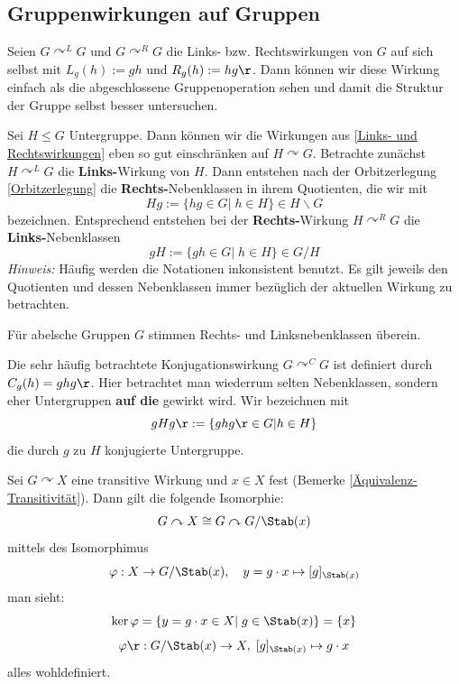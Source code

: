 \documentclass[11pt, a4paper]{article}
\begin{document}
\subsection{Gruppenwirkungen auf Gruppen}
\begin{definition} \label{Links- und Rechtswirkungen}
    Seien $G\curvearrowright^L G$ und $G\curvearrowright^R G$ die Links- bzw. Rechtswirkungen von $G$ auf sich selbst mit $L_g(h):=gh$ und $R_g(h):= hg\r$. Dann können wir diese Wirkung einfach als die abgeschlossene Gruppenoperation sehen und damit die Struktur der Gruppe selbst besser untersuchen.
\end{definition}
\begin{definition}[Nebenklassen]
Sei $H\leqslant G$ Untergruppe. Dann können wir die Wirkungen aus \ref{Links- und Rechtswirkungen} eben so gut einschränken auf $H \curvearrowright G$. Betrachte zunächst $H \curvearrowright^L G$ die \textbf{Links-}Wirkung von $H$. Dann entstehen nach der Orbitzerlegung \ref{Orbitzerlegung} die \textbf{Rechts-}Nebenklassen in ihrem Quotienten, die wir mit
$$Hg := \{hg \in G | \;  h \in H\}\in H\backslash G$$
bezeichnen. Entsprechend entstehen bei der \textbf{Rechts-}Wirkung $H \curvearrowright^R G$ die \textbf{Links-}Nebenklassen
$$gH:= \{gh \in G| \; h\in H\}\in G/H$$
\emph{Hinweis:} Häufig werden die Notationen inkonsistent benutzt. Es gilt jeweils den Quotienten und dessen Nebenklassen immer bezüglich der aktuellen Wirkung zu betrachten.
\end{definition}

\begin{note}
    Für abelsche Gruppen $G$ stimmen Rechts- und Linksnebenklassen überein.
\end{note}


\begin{definition}[Konjugationswirkung]
Die sehr häufig betrachtete Konjugationswirkung $G\curvearrowright^C G$ ist definiert durch $C_g(h)= ghg\r$. Hier betrachtet man wiederrum selten Nebenklassen, sondern eher Untergruppen \textbf{auf die} gewirkt wird. Wir bezeichnen mit
$$gHg\r := \{ghg\r \in G | h\in H\}$$
die durch $g$ zu $H$ konjugierte Untergruppe.
    
\end{definition}

\begin{theorem} \label{Klassifikation von transitiven Wirkungen}
Sei $G\curvearrowright X$ eine transitive Wirkung und $x\in X$ fest (Bemerke \ref{Äquivalenz-Transitivität}). Dann gilt die folgende Isomorphie:
$$G\curvearrowright X \cong G\curvearrowright G/\Stab(x)$$ mittels des Isomorphimus 
$$\varphi: X\to G/\Stab(x), \quad y = g\cdot x \mapsto [g]_{\Stab(x)}$$
man sieht:
$$\ker \varphi = \{y= g\cdot x\in X | \; g\in \Stab(x) \} = \{x\}$$
$$\varphi\r: G/\Stab(x) \to X, \;[g]_{\Stab(x)} \mapsto g\cdot x$$
alles wohldefiniert.
    
\end{theorem}
\end{document}
